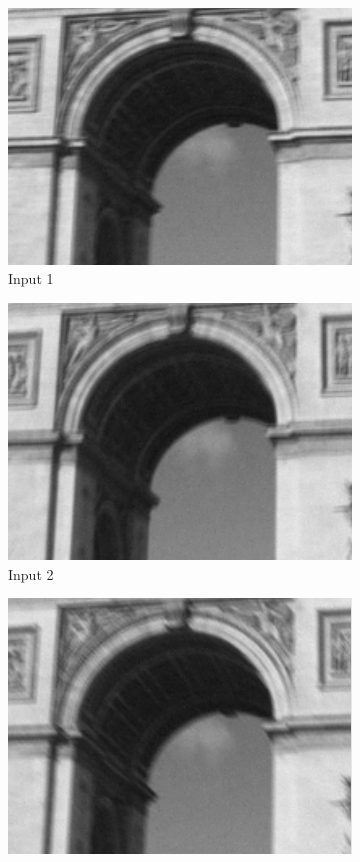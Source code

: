 \documentclass[a4paper,10pt]{report}
\begin{document}
\begin{figure}[h]
 
\begin{subfigure}{0.24\textwidth}
\includegraphics[width=0.9\linewidth]{ressource/detail_flou1.png} 
\caption{Input 1}
\label{fig:Flou1}
\end{subfigure}
\begin{subfigure}{0.24\textwidth}
\includegraphics[width=0.9\linewidth]{ressource/detail_flou2.png}
\caption{Input 2}
\label{fig:Flou2}
\end{subfigure}
\begin{subfigure}{0.24\textwidth}
\includegraphics[width=0.9\linewidth]{ressource/detail_flou3.png}

\end{subfigure}
\end{figure}
\end{document}
